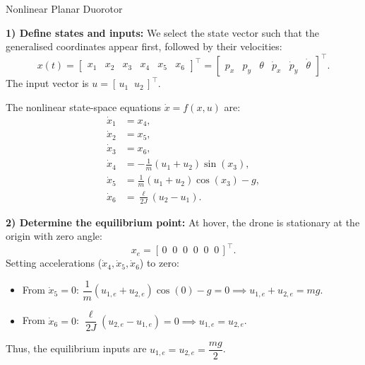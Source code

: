 \begin{examplebox}{Nonlinear Planar Duorotor}
\begin{center}
		\label{fig:duorotor_model}
\end{center}
	
	
	\medskip
	\solution
	\textbf{1) Define states and inputs:}
	We select the state vector such that the generalised coordinates appear first, followed by their velocities:
	\[
	x(t) = 
	\begin{bmatrix} x_1 & x_2 & x_3 & x_4 & x_5 & x_6 \end{bmatrix}^\top
	=
	\begin{bmatrix} p_x & p_y & \theta & \dot{p}_x & \dot{p}_y & \dot{\theta} \end{bmatrix}^\top.
	\]
	The input vector is $u = [\, u_1 \;\; u_2 \,]^\top$.
	
	The nonlinear state-space equations $\dot{x} = f(x,u)$ are:
	\begin{align*}
		\dot{x}_1 &= x_4, \\
		\dot{x}_2 &= x_5, \\
		\dot{x}_3 &= x_6, \\
		\dot{x}_4 &= -\frac{1}{m}(u_1+u_2)\sin(x_3), \\
		\dot{x}_5 &= \frac{1}{m}(u_1+u_2)\cos(x_3) - g, \\
		\dot{x}_6 &= \frac{\ell}{2J}(u_2 - u_1).
	\end{align*}
	
	\textbf{2) Determine the equilibrium point:}
	At hover, the drone is stationary at the origin with zero angle:
	\[
	x_e = [\, 0 \;\; 0 \;\; 0 \;\; 0 \;\; 0 \;\; 0 \,]^\top.
	\]
	Setting accelerations ($\dot{x}_4, \dot{x}_5, \dot{x}_6$) to zero:
	\begin{itemize}
		\item From $\dot{x}_5=0$: $\dfrac{1}{m}(u_{1,e}+u_{2,e})\cos(0) - g = 0 \implies u_{1,e}+u_{2,e} = mg$.
		\item From $\dot{x}_6=0$: $\dfrac{\ell}{2J}(u_{2,e}-u_{1,e}) = 0 \implies u_{1,e} = u_{2,e}$.
	\end{itemize}
	Thus, the equilibrium inputs are $u_{1,e} = u_{2,e} = \dfrac{mg}{2}$.
	

\end{examplebox}

